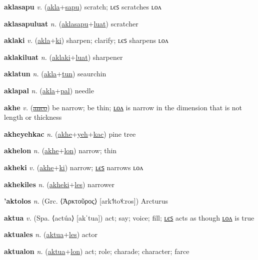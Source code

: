 \textbf{\hypertarget{aklasapu}{aklasapu}} \textit{v.} (\hyperlink{akla}{akla}+\allowbreak \hyperlink{sapu}{sapu})
scratch; ʟєꜱ scratches ʟᴏᴧ

\textbf{\hypertarget{aklasapuluat}{aklasapuluat}} \textit{n.} (\hyperlink{aklasapu}{aklasapu}+\allowbreak \hyperlink{luat}{luat})
scratcher

\textbf{\hypertarget{aklaki}{aklaki}} \textit{v.} (\hyperlink{akla}{akla}+\allowbreak \hyperlink{ki}{ki})
sharpen; clarify; ʟєꜱ sharpens ʟᴏᴧ

\textbf{\hypertarget{aklakiluat}{aklakiluat}} \textit{n.} (\hyperlink{aklaki}{aklaki}+\allowbreak \hyperlink{luat}{luat})
sharpener

\textbf{\hypertarget{aklatun}{aklatun}} \textit{n.} (\hyperlink{akla}{akla}+\allowbreak \hyperlink{tun}{tun})
seaurchin

\textbf{\hypertarget{aklapal}{aklapal}} \textit{n.} (\hyperlink{akla}{akla}+\allowbreak \hyperlink{pal}{pal})
needle

\textbf{\hypertarget{akhe}{akhe}} \textit{v.} (\hyperlink{anco}{\sout{anco}})
be narrow; be thin; \hyperlink{akhelon}{ʟᴏᴧ} is narrow in the dimension that is not length or thickness

\textbf{\hypertarget{akheyehkac}{akheyehkac}} \textit{n.} (\hyperlink{akhe}{akhe}+\allowbreak \hyperlink{yeh}{yeh}+\allowbreak \hyperlink{kac}{kac})
pine tree

\textbf{\hypertarget{akhelon}{akhelon}} \textit{n.} (\hyperlink{akhe}{akhe}+\allowbreak \hyperlink{lon}{lon})
narrow; thin

\textbf{\hypertarget{akheki}{akheki}} \textit{v.} (\hyperlink{akhe}{akhe}+\allowbreak \hyperlink{ki}{ki})
narrow; \hyperlink{akhekiles}{ʟєꜱ} narrows ʟᴏᴧ

\textbf{\hypertarget{akhekiles}{akhekiles}} \textit{n.} (\hyperlink{akheki}{akheki}+\allowbreak \hyperlink{les}{les})
narrower

\textbf{\hypertarget{'aktolos}{'aktolos}} \textit{n.} (Grc. ⟨Ἀρκτοῦρος⟩ [ark˦to˦˨ːros])
Arcturus

\textbf{\hypertarget{aktua}{aktua}} \textit{v.} (Spa. ⟨actúa⟩ [akˈtua])
act; say; voice; fill; \hyperlink{aktuales}{ʟєꜱ} acts as though \hyperlink{aktualon}{ʟᴏᴧ} is true

\textbf{\hypertarget{aktuales}{aktuales}} \textit{n.} (\hyperlink{aktua}{aktua}+\allowbreak \hyperlink{les}{les})
actor

\textbf{\hypertarget{aktualon}{aktualon}} \textit{n.} (\hyperlink{aktua}{aktua}+\allowbreak \hyperlink{lon}{lon})
act; role; charade; character; farce

